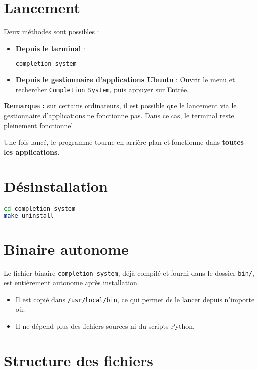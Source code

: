 \section*{Lancement}

Deux méthodes sont possibles :

\begin{itemize}
	\item \textbf{Depuis le terminal} :
	      \begin{lstlisting}[language=bash]
completion-system
  \end{lstlisting}

	\item \textbf{Depuis le gestionnaire d'applications Ubuntu} :
	      Ouvrir le menu et rechercher \texttt{Completion System}, puis appuyer sur Entrée.
\end{itemize}


\textbf{Remarque :} sur certains ordinateurs, il est possible que le lancement via le gestionnaire d’applications ne fonctionne pas. Dans ce cas, le terminal reste pleinement fonctionnel.

Une fois lancé, le programme tourne en arrière-plan et fonctionne dans \textbf{toutes les applications}.

\section*{Désinstallation}

\begin{lstlisting}[language=bash]
cd completion-system
make uninstall
\end{lstlisting}

\section*{Binaire autonome}

Le fichier binaire \texttt{completion-system}, déjà compilé et fourni dans le dossier \texttt{bin/}, est entièrement autonome après installation.

\begin{itemize}
	\item Il est copié dans \texttt{/usr/local/bin}, ce qui permet de le lancer depuis n'importe où.
	\item Il ne dépend plus des fichiers sources ni du scripts Python.
\end{itemize}

\section*{Structure des fichiers}

